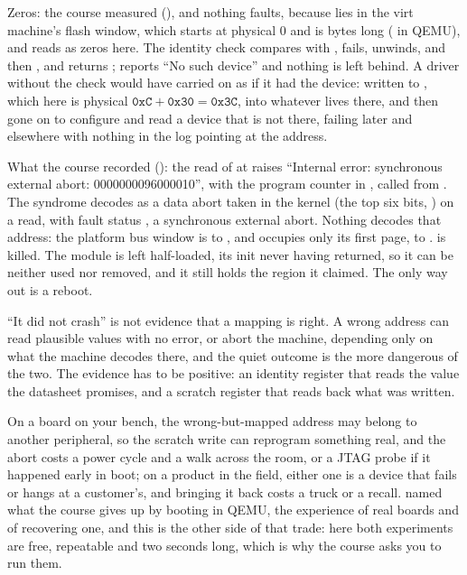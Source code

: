  Zeros: the course measured  (), and
nothing faults, because  lies in the virt machine's flash window, which starts at
physical 0 and is  bytes long ( in QEMU), and reads as zeros
here. The identity check compares  with , fails, unwinds,
 and then , and returns ;  reports
``No such device'' and nothing is left behind. A driver without the check would have carried on as
if it had the device: written  to , which here is physical
$\texttt{0xC} + \texttt{0x30} = \texttt{0x3C}$, into whatever lives there, and then gone on to
configure and read a device that is not there, failing later and elsewhere with nothing in the log
pointing at the address.

 What the course recorded (): the read of  at
 raises ``Internal error: synchronous external abort: 0000000096000010'', with the
program counter in , called from . The syndrome
decodes as a data abort taken in the kernel (the top six bits, ) on a read, with fault
status , a synchronous external abort. Nothing decodes that address: the platform bus
window is  to , and  occupies only its first page,
 to .  is killed. The module is left half-loaded,
its init never having returned, so it can be neither used nor removed, and it still holds the
region it claimed. The only way out is a reboot.

 ``It did not crash'' is not evidence that a mapping is right. A wrong address can read
plausible values with no error, or abort the machine, depending only on what the machine decodes
there, and the quiet outcome is the more dangerous of the two. The evidence has to be positive: an
identity register that reads the value the datasheet promises, and a scratch register that reads
back what was written.

 On a board on your bench, the wrong-but-mapped address may belong to another peripheral,
so the scratch write can reprogram something real, and the abort costs a power cycle and a walk
across the room, or a JTAG probe if it happened early in boot; on a product in the field, either
one is a device that fails or hangs at a customer's, and bringing it back costs a truck or a recall.
 named what the course gives up by booting in QEMU, the experience of real boards
and of recovering one, and this is the other side of that trade: here both experiments are free,
repeatable and two seconds long, which is why the course asks you to run them.

